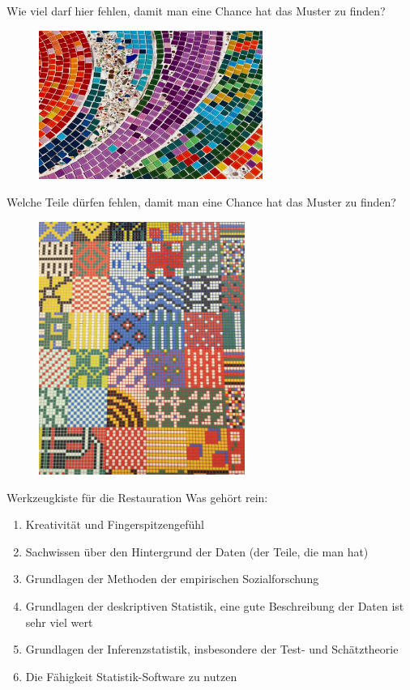 \documentclass[usenames,dvipsnames,handout]{beamer}
\begin{document}
\begin{frame}{Wie viel darf hier fehlen, damit man eine Chance hat das Muster zu finden?}
     \begin{figure}[ht]
 	\centering
 	      \includegraphics[width=0.65\textwidth]{mosaic-pattern.jpg}
 	\end{figure}
\end{frame}

\begin{frame}{Welche Teile dürfen fehlen, damit man eine Chance hat das Muster zu finden?}
     \begin{figure}[ht]
 	\centering
 	      \includegraphics[angle=90,width=0.6\textwidth]{patchwork.jpg}
 	\end{figure}
\end{frame}

\begin{frame}{Werkzeugkiste für die Restauration}
Was gehört rein:
\begin{enumerate}
\item{Kreativität und Fingerspitzengefühl }\pause
\item{Sachwissen über den Hintergrund der Daten (der Teile, die man hat)}\pause
\item{Grundlagen der Methoden der empirischen Sozialforschung}\pause
\item{Grundlagen der deskriptiven Statistik, eine gute Beschreibung der Daten ist sehr viel wert}\pause
\item{Grundlagen der Inferenzstatistik, insbesondere der Test- und Schätztheorie}\pause
\item{Die Fähigkeit Statistik-Software zu nutzen}
\end{enumerate}
\end{frame}
\end{document}
